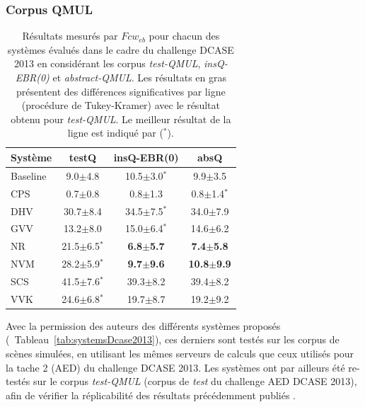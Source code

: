 \subsubsection{Corpus QMUL}

\begin{table}[t] 
\begin{center}  
\begin{tabular}{lccc}  
Système  & testQ & insQ-EBR(0) & absQ \\ 
\hline 
Baseline & 9.0$\pm$4.8      & 10.5$\pm$3.0$^*$     & 9.9$\pm$3.5 \\ 
CPS      & 0.7$\pm$0.8      & 0.8$\pm$1.3          & 0.8$\pm$1.4$^*$ \\ 
DHV      & 30.7$\pm$8.4     & 34.5$\pm$7.5$^*$     & 34.0$\pm$7.9 \\ 
GVV      & 13.2$\pm$8.0     & 15.0$\pm$6.4$^*$     & 14.6$\pm$6.2 \\ 
NR       & 21.5$\pm$6.5$^*$ & \textbf{6.8$\pm$5.7} & \textbf{7.4$\pm$5.8} \\ 
NVM      & 28.2$\pm$5.9$^*$ & \textbf{9.7$\pm$9.6} & \textbf{10.8$\pm$9.9} \\ 
SCS      & 41.5$\pm$7.6$^*$ & 39.3$\pm$8.2         & 39.4$\pm$8.2 \\ 
VVK      & 24.6$\pm$6.8$^*$ & 19.7$\pm$8.7         & 19.2$\pm$9.2 \\  
\hline
\end{tabular} 
\end{center} 
\caption[Résultats mesurés par $Fcw_{eb}$ pour chacun des systèmes évalués dans le cadre du challenge DCASE 2013 en considérant les corpus \emph{test-QMUL}, \emph{insQ-EBR(0)} et \emph{abstract-QMUL}.]{Résultats mesurés par $Fcw_{eb}$ pour chacun des systèmes évalués dans le cadre du challenge DCASE 2013 en considérant les corpus \emph{test-QMUL}, \emph{insQ-EBR(0)} et \emph{abstract-QMUL}. Les résultats en gras présentent des différences significatives par ligne (procédure de Tukey-Kramer) avec le résultat obtenu pour \emph{test-QMUL}. Le meilleur résultat de la ligne est indiqué par ($^*$).} 
\label{tab:qmul} 
\end{table} 

Avec la permission des auteurs des différents systèmes proposés (\cf~Tableau~\ref{tab:systemsDcase2013}), ces derniers sont testés sur les corpus de scènes simulées, en utilisant les mêmes serveurs de calculs que ceux utilisés pour la tache 2 (AED) du challenge DCASE 2013. Les systèmes ont par ailleurs été re-testés sur le corpus \emph{test-QMUL} (corpus de \emph{test} du challenge AED DCASE 2013), afin de vérifier la réplicabilité des résultats précédemment publiés \citep{Stowell15}.

